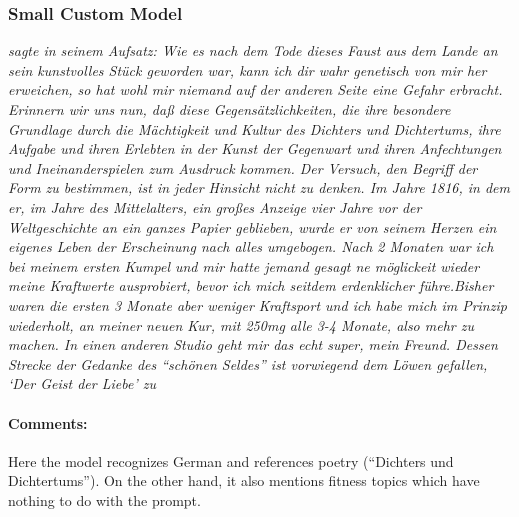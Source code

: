 \documentclass{scrartcl}
\begin{document}
\subsubsection{Small Custom Model}
{\itshape sagte in seinem Aufsatz: Wie es nach dem Tode dieses Faust aus dem Lande an sein kunstvolles Stück geworden war, kann ich dir wahr genetisch von mir her erweichen, so hat wohl mir niemand auf der anderen Seite eine Gefahr erbracht.
Erinnern wir uns nun, daß diese Gegensätzlichkeiten, die ihre besondere Grundlage durch die Mächtigkeit und Kultur des Dichters und Dichtertums, ihre Aufgabe und ihren Erlebten in der Kunst der Gegenwart und ihren Anfechtungen und Ineinanderspielen zum Ausdruck kommen.
Der Versuch, den Begriff der Form zu bestimmen, ist in jeder Hinsicht nicht zu denken.
Im Jahre 1816, in dem er, im Jahre des Mittelalters, ein großes Anzeige vier Jahre vor der Weltgeschichte an ein ganzes Papier geblieben, wurde er von seinem Herzen ein eigenes Leben der Erscheinung nach alles umgebogen.
Nach 2 Monaten war ich bei meinem ersten Kumpel und mir hatte jemand gesagt ne möglickeit wieder meine Kraftwerte ausprobiert, bevor ich mich seitdem erdenklicher führe.Bisher waren die ersten 3 Monate aber weniger Kraftsport und ich habe mich im Prinzip wiederholt, an meiner neuen Kur, mit 250mg alle 3-4 Monate, also mehr zu machen.
In einen anderen Studio geht mir das echt super, mein Freund.
Dessen Strecke der Gedanke des \enquote{schönen Seldes} ist vorwiegend dem Löwen gefallen, ‘Der Geist der Liebe’ zu}

\paragraph{Comments:}
Here the model recognizes German and references poetry (\enquote{Dichters und Dichtertums}). On the other hand, it also mentions fitness topics which have nothing to do with the prompt.
\end{document}
